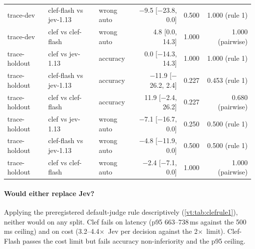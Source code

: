 \documentclass[11pt,letterpaper]{article}
\newcommand{\X}{\ensuremath{\times}}
\newcommand{\ClClefCostXHigh}{4.4}
\newcommand{\ClClefCostXLow}{3.2}
\newcommand{\ClClefPninetyfiveHigh}{738}
\newcommand{\ClClefPninetyfiveLow}{663}
\newcommand{\ClRuleOneCostX}{2}
\newcommand{\ClRuleOneMaxPninetyfive}{500}
\begin{document}
\begin{table}[tbp]
\begin{tabular*}{\textwidth}{@{\extracolsep{\fill}}l l l r r r@{}}
trace-dev & clef-flash vs jev-1.13 & wrong auto & $-$9.5 [$-$23.8, 0.0] & 0.500 & 1.000 (rule 1) \\
trace-dev & clef vs clef-flash & wrong auto & 4.8 [0.0, 14.3] & 1.000 & 1.000 (pairwise) \\
\addlinespace[2pt]
trace-holdout & clef vs jev-1.13 & accuracy & 0.0 [$-$14.3, 14.3] & 1.000 & 1.000 (rule 1) \\
trace-holdout & clef-flash vs jev-1.13 & accuracy & $-$11.9 [$-$26.2, 2.4] & 0.227 & 0.453 (rule 1) \\
trace-holdout & clef vs clef-flash & accuracy & 11.9 [$-$2.4, 26.2] & 0.227 & 0.680 (pairwise) \\
trace-holdout & clef vs jev-1.13 & wrong auto & $-$7.1 [$-$16.7, 0.0] & 0.250 & 0.500 (rule 1) \\
trace-holdout & clef-flash vs jev-1.13 & wrong auto & $-$4.8 [$-$11.9, 0.0] & 0.500 & 0.500 (rule 1) \\
trace-holdout & clef vs clef-flash & wrong auto & $-$2.4 [$-$7.1, 0.0] & 1.000 & 1.000 (pairwise) \\
\bottomrule
\end{tabular*}
 \end{table}

\paragraph{Would either replace Jev?} Applying the preregistered default-judge rule descriptively (\cref{vt:tab:clefrule1}),
neither would on any split. Clef fails on latency (p95 \ClClefPninetyfiveLow--\ClClefPninetyfiveHigh\,ms against the
\ClRuleOneMaxPninetyfive\,ms ceiling) and on cost (\ClClefCostXLow--\ClClefCostXHigh\X\ Jev per decision against the
\ClRuleOneCostX\X\ limit). Clef-Flash passes the cost limit but fails accuracy non-inferiority and the p95 ceiling.
\end{document}
